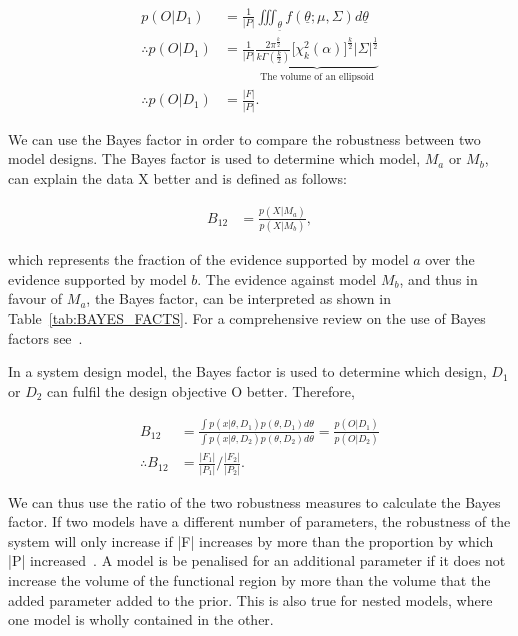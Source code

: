 \begin{align}
p(O|D_1) &= \frac{1}{|P|}\iiint_{\underline{\theta}}f(\underline{\theta};\mu,\Sigma)d\underline{\theta} \\%
\therefore p(O|D_1) &= \frac{1}{|P|}\underbrace{\frac{2\pi^{\frac{k}{2}}}{k\Gamma(\frac{k}{2})} \Big[ \chi _{k}^{2}(\alpha) \Big]^{\frac{k}{2}} |\Sigma|^\frac{1}{2}}_{\text{The volume of an ellipsoid}} \\
\therefore p(O|D_1) &= \frac{|F|}{|P|}.
\end{align}



\noindent We can use the Bayes factor in order to compare the robustness between two model designs. The Bayes factor is used to determine which model, $M_a$ or $M_b$, can explain the data X better and is defined as follows:

\begin{align}
 B_{12} &= \frac{p(X|M_a)}{p(X|M_b)}, \label{eq:final_bayes1}
\end{align}	

\noindent which represents the fraction of the evidence supported by model $a$ over the evidence supported by model $b$. The evidence against model $M_b$, and thus in favour of $M_a$, the Bayes factor, can be interpreted as shown in Table~\ref{tab:BAYES_FACTS}. For a comprehensive review on the use of Bayes factors see~\textcite{Kass:1995vb}.


In a system design model, the Bayes factor is used to determine which design, $D_1$ or $D_2$ can fulfil the design objective O better. Therefore,


\begin{align}
B_{12} &= \frac{\displaystyle \int p(x|\theta, D_1)p(\theta, D_1)d\theta}{\displaystyle \int p(x|\theta, D_2)p(\theta, D_2)d\theta} = \frac{p(O|D_1)}{p(O|D_2)}\\
\therefore B_{12} &= \frac{|F_1|}{|P_1|} / \frac{|F_2|}{|P_2|}. \label{eq:final_bayes}
\end{align}

\noindent We can thus use the ratio of the two robustness measures to calculate the Bayes factor. If two models have a different number of parameters, the robustness of the system will only increase if |F| increases by more than the proportion by which |P| increased~\autocite{Woods:2016eh}. A model is be penalised for an additional parameter if it does not increase the volume of the functional region by more than the volume that the added parameter added to the prior. This is also true for nested models, where one model is wholly contained in the other. 


